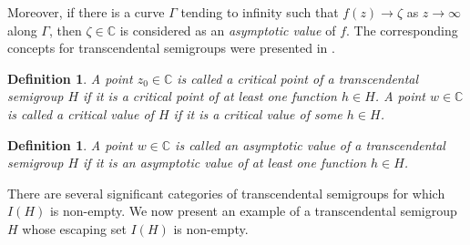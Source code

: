 \documentclass[a4paper,12pt]{amsart}
\numberwithin{equation}{section}
\newtheorem{definition}[theorem]{Definition}
\begin{document}
	Moreover, if there is a curve $\Gamma$ tending to infinity such that $f(z) \to \zeta$ as $z \to \infty$ along $\Gamma$, then $\zeta \in \mathbb{C}$ is considered as an \emph{asymptotic value} of $f$. The corresponding concepts for transcendental semigroups were presented in \cite{kumar2015dynamics}.
	
	\begin{definition}
		A point $z_0 \in \mathbb{C}$ is called a \emph{critical point} of a
		transcendental semigroup $H$ if it is a critical point of at least one
		function $h \in H$. A point $w \in \mathbb{C}$ is called a
		\emph{critical value} of $H$ if it is a critical value of some
		$h \in H$.
	\end{definition}
	
	\begin{definition}
		A point $w \in \mathbb{C}$ is called an \emph{asymptotic value} of a
		transcendental semigroup $H$ if it is an asymptotic value of at least one
		function $h \in H$.
	\end{definition}
There are several significant categories of transcendental semigroups for which $I(H)$ is non-empty. We now present an example of a transcendental semigroup $H$ whose escaping set $I(H)$ is non-empty.     
\end{document}
